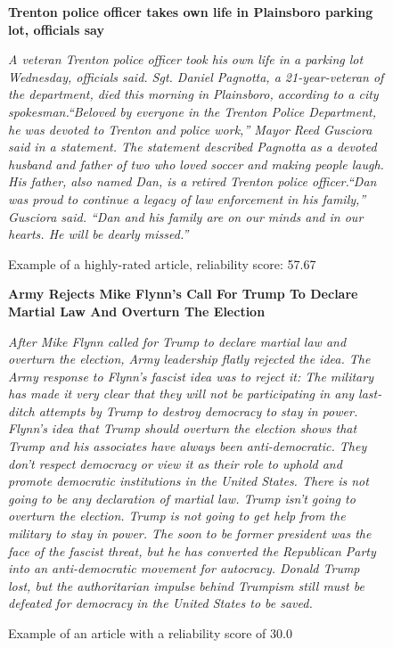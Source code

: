 \begin{figure}[htbp]
    \centering
    \begin{minipage}{0.9\linewidth}
        \begin{center}
            \small{\textbf{Trenton police officer takes own life in Plainsboro parking lot, officials say}}
        \end{center}
        \scriptsize{\textit{
                A veteran Trenton police officer took his own life in a parking lot Wednesday, officials said. Sgt. Daniel Pagnotta, a 21-year-veteran of the department, died this morning in Plainsboro, according to a city spokesman.“Beloved by everyone in the Trenton Police Department, he was devoted to Trenton and police work,” Mayor Reed Gusciora said in a statement. The statement described Pagnotta as a devoted husband and father of two who loved soccer and making people laugh. His father, also named Dan, is a retired Trenton police officer.“Dan was proud to continue a legacy of law enforcement in his family,” Gusciora said. “Dan and his family are on our minds and in our hearts. He will be dearly missed.”}}
    \end{minipage}
    \caption{Example of a highly-rated article, reliability score: 57.67 \cite{spinde-2023-bat}}
    \label{fig:example-nonbiased-article-1}
\end{figure}

\begin{figure}[htbp]
    \centering
    \begin{minipage}{0.9\linewidth}
        \begin{center}
            \small{\textbf{Army Rejects Mike Flynn’s Call For Trump To Declare Martial Law And Overturn The Election}}
        \end{center}
        \scriptsize{\textit{
                After Mike Flynn called for Trump to declare martial law and overturn the election, Army leadership flatly rejected the idea. The Army response to Flynn’s fascist idea was to reject it: The military has made it very clear that they will not be participating in any last-ditch attempts by Trump to destroy democracy to stay in power. Flynn’s idea that Trump should overturn the election shows that Trump and his associates have always been anti-democratic. They don’t respect democracy or view it as their role to uphold and promote democratic institutions in the United States. There is not going to be any declaration of martial law. Trump isn’t going to overturn the election. Trump is not going to get help from the military to stay in power. The soon to be former president was the face of the fascist threat, but he has converted the Republican Party into an anti-democratic movement for autocracy. Donald Trump lost, but the authoritarian impulse behind Trumpism still must be defeated for democracy in the United States to be saved.}}
    \end{minipage}
    \caption{Example of an article with a reliability score of 30.0 \cite{spinde-2023-bat}}
    \label{fig:example-mixed-biased-article-1}
\end{figure}

